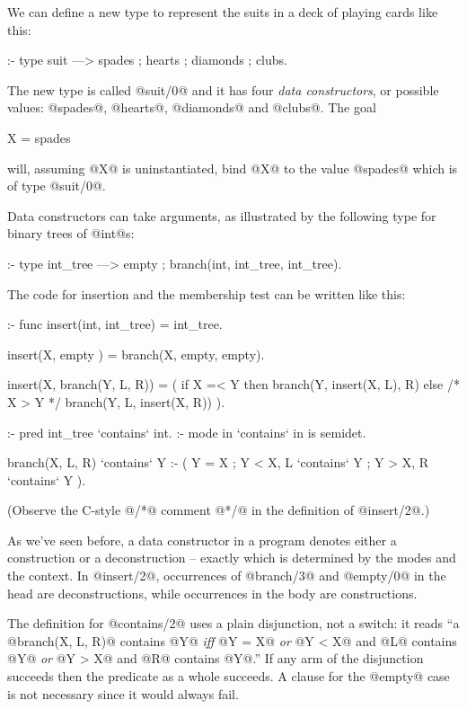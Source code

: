 We can define a new type to represent the suits in a deck of playing
cards like this:
\begin{myverbatim}
:- type suit ---> spades ; hearts ; diamonds ; clubs.
\end{myverbatim}
The new type is called @suit/0@ and it has four 
\emph{data constructors}, or possible values: @spades@, @hearts@,
@diamonds@ and @clubs@.  The goal
\begin{myverbatim}
    X = spades
\end{myverbatim}
will, assuming @X@ is uninstantiated, bind @X@ to the value @spades@ which
is of type @suit/0@.

Data constructors can take arguments, as illustrated by the following type
for binary trees of @int@s:
\begin{myverbatim}
:- type int_tree ---> empty ; branch(int, int_tree, int_tree).
\end{myverbatim}
The code for insertion and the membership test can be written like
this:
\begin{myverbatim}
:- func insert(int, int_tree) = int_tree.

insert(X, empty          ) = branch(X, empty, empty).

insert(X, branch(Y, L, R)) =
    (      if X =< Y then branch(Y, insert(X, L), R)
      else /* X  > Y */   branch(Y, L, insert(X, R))
    ).

:- pred int_tree `contains` int.
:- mode in       `contains` in is semidet.

branch(X, L, R) `contains` Y :-
    (   Y = X
    ;   Y < X,  L `contains` Y
    ;   Y > X,  R `contains` Y
    ).
\end{myverbatim}
(Observe the C-style @/*@ comment @*/@ in the definition of @insert/2@.)

As we've seen before, a data constructor in a program denotes either a
construction or a deconstruction -- exactly which is determined by the
modes and the context.  In @insert/2@, occurrences of @branch/3@ and
@empty/0@ in the head are deconstructions, while occurrences in the body are
constructions.

The definition for @contains/2@ uses a plain disjunction, not a switch:
it reads ``a @branch(X, L, R)@ contains @Y@ \emph{iff} @Y = X@
\emph{or} @Y < X@ and @L@ contains @Y@ \emph{or} @Y > X@ and @R@
contains @Y@.''
If any arm of the disjunction succeeds then the predicate as a
whole succeeds.  A clause for the @empty@ case is not necessary since it
would always fail.

